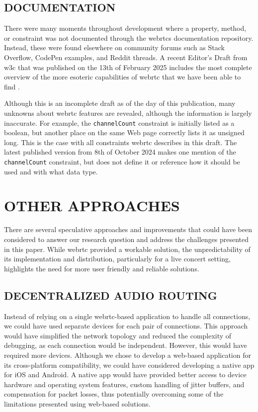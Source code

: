 \documentclass[fleqn]{jaes}
\begin{document}
\subsection{DOCUMENTATION}
There were many moments throughout development where a property, method, or constraint was not documented through the \Glspl{webrtc} documentation repository. Instead, these were found elsewhere on community forums such as Stack Overflow, CodePen examples, and Reddit threads. A recent Editor’s Draft from \gls{w3c} that was published on the 13th of February 2025 includes the most complete overview of the more esoteric capabilities of \gls{webrtc} that we have been able to find \cite{jennings_webrtc_nodate}.

Although this is an incomplete draft as of the day of this publication, many unknowns about \gls{webrtc} features are revealed, although the information is largely inaccurate. For example, the \texttt{channelCount} constraint is initially listed as a boolean, but another place on the same Web page correctly lists it as unsigned long. This is the case with all constraints \gls{webrtc} describes in this draft. The latest published version from 8th of October 2024 makes one mention of the \texttt{channelCount} constraint, but does not define it or reference how it should be used and with what data type.

\section{OTHER APPROACHES}
There are several speculative approaches and improvements that could have been considered to answer our research question and address the challenges presented in this paper. While \gls{webrtc} provided a workable solution, the unpredictability of its implementation and distribution, particularly for a live concert setting, highlights the need for more user friendly and reliable solutions.

\subsection{DECENTRALIZED AUDIO ROUTING}
Instead of relying on a single \gls{webrtc}-based application to handle all connections, we could have used separate devices for each pair of connections. This approach would have simplified the network topology and reduced the complexity of debugging, as each connection would be independent. However, this would have required more devices. Although we chose to develop a web-based application for its cross-platform compatibility, we could have considered developing a native app for iOS and Android. A native app would have provided better access to device hardware and operating system features, custom handling of jitter buffers, and compensation for packet losses, thus potentially overcoming some of the limitations presented using web-based solutions.
\end{document}
